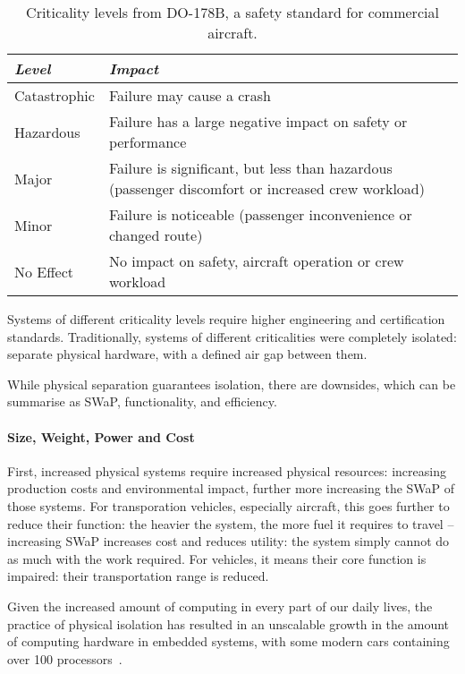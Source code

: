 \begin{table}
    \centering
    \begin{tabular}{ l p{10cm}} \toprule
			\emph{Level} & \emph{Impact} \\ \midrule
			Catastrophic   & Failure may cause a crash \\
			Hazardous      & Failure has a large negative impact on safety or performance \\ 
			Major          & Failure is significant, but less than hazardous (passenger discomfort or increased crew workload) \\  
			Minor          & Failure is noticeable (passenger inconvenience or changed route) \\
			No Effect      & No impact on safety, aircraft operation or crew workload \\ 
        \bottomrule
		\end{tabular}
		\caption{Criticality levels from DO-178B, a safety standard for commercial aircraft.}
		\label{tab:criticality_table}
\end{table}    

Systems of different criticality levels require higher engineering and certification standards.
Traditionally, systems of different criticalities were completely isolated: separate physical hardware, with a defined air gap between them. %

While physical separation guarantees isolation, there are downsides, which can be summarise as \gls{SWaP}, functionality, and efficiency.

\paragraph{Size, Weight, Power and Cost}

First, increased physical systems require increased physical resources: increasing production costs and environmental impact, further more increasing the \gls{SWaP} of those systems.
For transporation vehicles, especially aircraft, this goes further to reduce their function: the heavier the system, the more fuel it requires to travel -- increasing \gls{SWaP} increases cost and reduces utility: the system simply cannot do as much with the work required. 
For vehicles, it means their core function is impaired: their transportation range is reduced.

Given the increased amount of computing in every part of our daily lives, the practice of physical isolation has resulted in an unscalable growth in the amount of computing hardware in embedded systems, with some modern cars containing over 100 processors~\citep{Hergenhan_Heiser_08}.

